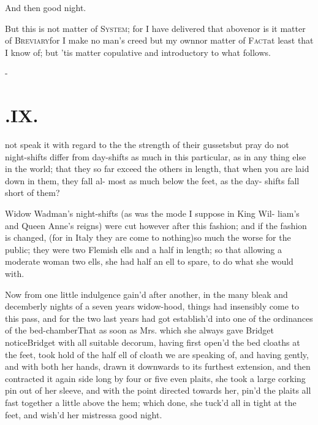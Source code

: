 \documentclass{article}
\begin{document}
\tsk And then good night.

But this is not matter of \textsc{System}; for I have
delivered that above\tsh nor is it matter of
\textsc{Breviary}\tsh for I make no man’s
creed but my own\tsh nor matter of
\textsc{Fact}\tsh at least that I know of;\break
but ’tis matter copulative and introductory to what follows.

\vfill{}\eject
\null\kern-\baselineskip
\section{.\enspace IX.}

 not speak it with regard to the\break
{}\break 
the strength of their gussets\tsh but pray\break
do not night-shifts differ from day-shifts\break
as much in this particular, as in any\break
thing else in the world; that they so far\break
exceed the others in length, that when\break
you are laid down in them, they fall al-\break
most as much below the feet, as the day-\break
shifts fall short of them?

Widow Wadman’s night-shifts (as\break
was the mode I suppose in King Wil-\break
liam’s and Queen Anne’s reigns) were\break
cut however after this fashion; and if the\break
fashion is changed, (for in Italy they are\break
come to nothing)\tsh so much the worse
for the public; they were two Flemish ells
and a half in length; so that allow\-ing a moderate woman two ells,
she had half an ell to spare, to do what she would with.

Now from one little indulgence gain’d after another, in the many
bleak and decemberly nights of a seven years widow-hood, things
had insensibly come to this pass, and for the two last years had
got establish’d into one of the ordinances of the
bed-chamber\tsk That as soon as Mrs.\@ 
{}
which she always gave Bridget notice\tsk Bridget with all
suitable decorum, having first open’d the bed cloaths at the
feet, took hold of the half ell of cloath we are speaking of,
and having gently, and with both her hands, drawn it
downwards to its furthest extension, and then contracted it
again side long by four or five even plaits, she took a large
corking pin out of her sleeve, and with the point directed
towards her, pin’d the plaits all fast together a little above
the hem; which done, she tuck’d all in tight at the feet, and
wish’d her mistress\break a good night.
\end{document}
